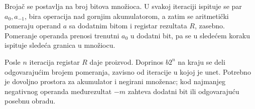 Brojač se postavlja na broj bitova množioca. U svakoj iteraciji ispituje se par $a_0,a_{-1}$, bira operacija nad gornjim akumulatorom, a zatim se aritmetički pomeraju operand $a$ sa dodatnim bitom i registar rezultata $R$, zasebno. Pomeranje operanda prenosi trenutni $a_0$ u dodatni bit, pa se u sledećem koraku ispituje sledeća granica u množiocu.

Posle $n$ iteracija registar $R$ daje proizvod. Doprinos $b2^n$ na kraju se deli odgovarajućim brojem pomeranja, zavisno od iteracije u kojoj je unet. Potrebno je dovoljno prostora za akumulator i negirani množenac; kod najmanjeg negativnog operanda međurezultat $-m$ zahteva dodatni bit ili odgovarajuću posebnu obradu.
